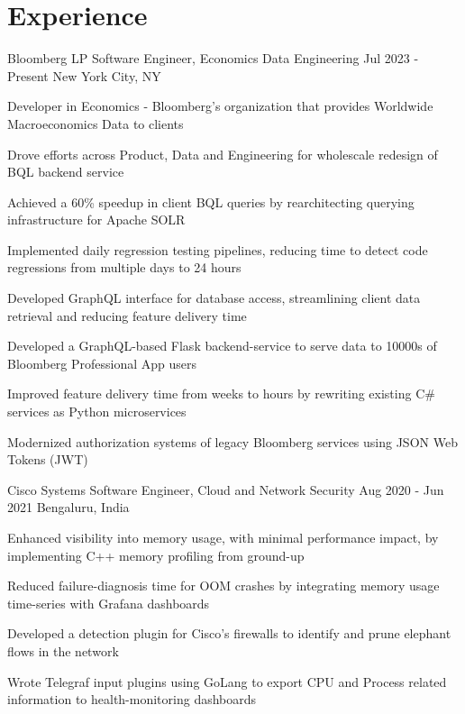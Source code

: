 \section{Experience}
\resumeSubHeadingListStart

\resumeExp
{Bloomberg LP}
{Software Engineer, Economics Data Engineering}
{Jul 2023 - Present}
{New York City, NY}

\resumeItemListStart
\item[$\bullet$] Developer in Economics - Bloomberg's organization that provides Worldwide Macroeconomics Data to clients
\item[$\bullet$] Drove efforts across Product, Data and Engineering for wholescale redesign of BQL backend service
\item[$\bullet$] Achieved a 60\% speedup in client BQL queries by rearchitecting querying infrastructure for Apache SOLR
\item[$\bullet$] Implemented daily regression testing pipelines, reducing time to detect code regressions from multiple days to 24 hours
\item[$\bullet$] Developed GraphQL interface for database access, streamlining client data retrieval and reducing feature delivery time
\resumeItemListEnd


\resumeItemListStart
\item[$\bullet$] Developed a GraphQL-based Flask backend-service to serve data to 10000s of Bloomberg Professional App users
\item[$\bullet$] Improved feature delivery time from weeks to hours by rewriting existing C\# services as Python microservices
\item[$\bullet$] Modernized authorization systems of legacy Bloomberg services using JSON Web Tokens (JWT)
\resumeItemListEnd

\resumeExp
{Cisco Systems}
{Software Engineer, Cloud and Network Security}
{Aug 2020 - Jun 2021}
{Bengaluru, India}

\resumeItemListStart
		\item[$\bullet$] Enhanced visibility into memory usage, with minimal performance impact, by implementing C++ memory profiling from ground-up
        \item[$\bullet$] Reduced failure-diagnosis time for OOM crashes by integrating memory usage time-series with Grafana dashboards
        \item[$\bullet$] Developed a detection plugin for Cisco's firewalls to identify and prune elephant flows in the network
        \item[$\bullet$] Wrote Telegraf input plugins using GoLang to export CPU and Process related information to health-monitoring dashboards
\resumeItemListEnd

